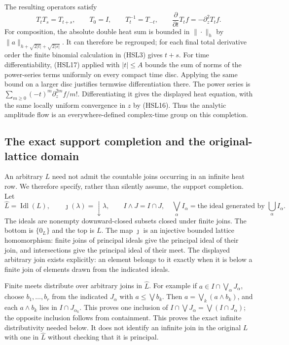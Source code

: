 The resulting operators satisfy
\begin{equation}\tag{HSL18}
 T_tT_s=T_{t+s},\qquad T_0=I,\qquad
 T_t^{-1}=T_{-t},\qquad
 \frac{\partial}{\partial t}T_tf=-\partial_z^2T_tf.
\end{equation}
For composition, the absolute double heat sum is bounded in
$\|\cdot\|_h$ by
$\|a\|_{h+\sqrt{2|t|}+\sqrt{2|s|}}$.
It can therefore be regrouped; for each final total derivative
order the finite binomial calculation in (HSL3) gives $t+s$.
For time differentiability, (HSL17) applied with $|t|\le A$
bounds the sum of norms of the power-series terms uniformly
on every compact time disc. Applying the same bound on a
larger disc justifies termwise differentiation there. The
power series is
$\sum_{m\ge0}(-t)^m\partial_z^{2m}f/m!$.
Differentiating it gives the displayed heat equation, with
the same locally uniform convergence in $z$ by (HSL16).
Thus the analytic amplitude flow is an everywhere-defined
complex-time group on this completion.

\subsection{The exact support completion and the original-lattice domain}

An arbitrary $L$ need not admit the countable joins occurring
in an infinite heat row. We therefore specify, rather than
silently assume, the support completion. Let
\begin{equation}\tag{HSL19}
 \widehat L=\operatorname{Idl}(L),\qquad
 \jmath(\lambda)=\downarrow\lambda,\qquad
 I\wedge J=I\cap J,\quad
 \bigvee_\alpha I_\alpha
      =\text{the ideal generated by }\bigcup_\alpha I_\alpha .
\end{equation}
The ideals are nonempty downward-closed subsets closed under
finite joins. The bottom is $\{0_L\}$ and the top is $L$.
The map $\jmath$ is an injective bounded lattice homomorphism:
finite joins of principal ideals give the principal ideal
of their join, and intersections give the principal ideal
of their meet. The displayed arbitrary join exists explicitly:
an element belongs to it exactly when it is below a finite
join of elements drawn from the indicated ideals.

Finite meets distribute over arbitrary joins in $\widehat L$.
For example if $a\in I\cap\bigvee_\alpha J_\alpha$, choose
$b_1,\ldots,b_r$ from the indicated $J_\alpha$ with
$a\le\bigvee b_k$. Then
$a=\bigvee_k(a\wedge b_k)$, and each $a\wedge b_k$ lies in
$I\cap J_{\alpha_k}$. This proves one inclusion of
$I\cap\bigvee J_\alpha=\bigvee(I\cap J_\alpha)$;
the opposite inclusion follows from containment.
This proves the exact infinite distributivity needed below.
It does not identify an infinite join in the original $L$
with one in $\widehat L$ without checking that it is principal.

